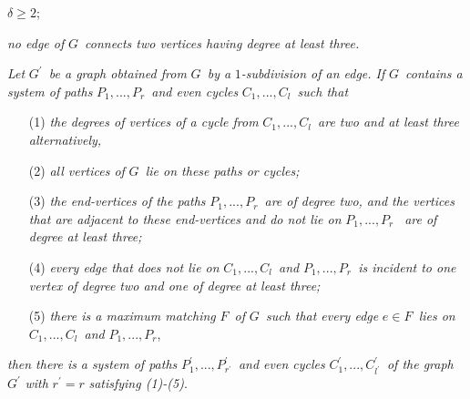 \documentclass[fleqn,12pt,twoside]{article}
\begin{document}
\begin{description}
\item[(a)] $\delta \geq 2$;

\item[(b)] \textit{no edge of }$G$\textit{\ connects two vertices having degree at
least three.}

\item[ ] \textit{Let }$G^{\prime }$\textit{\ be a graph obtained from }$G$\textit{\ by a }$1$\textit{-subdivision of an edge. If }$G$\textit{\
contains a system of paths }$P_{1},...,P_{r}$\textit{\ and even cycles }$C_{1},...,C_{l}$\textit{\ such that }

\begin{enumerate}
\item[(1)] \textit{the degrees of vertices of a cycle from }$C_{1},...,C_{l}$\textit{\ are two and at least three alternatively,}

\item[(2)] \textit{all vertices of }$G$\textit{\ lie on these paths or
cycles;}

\item[(3)] \textit{the end-vertices of the paths }$P_{1},...,P_{r}$\textit{\
are of degree two, and the vertices that are adjacent to these
end-vertices and do not lie on }$P_{1},...,P_{r}$ \textit{\ are of
degree at least three;}

\item[(4)] \textit{every edge that does not lie on }$C_{1},...,C_{l}$\textit{\ and }$P_{1},...,P_{r}$\textit{\ is incident to one vertex of
degree two and one of degree at least three;}

\item[(5)] \textit{there is a maximum matching }$F$\textit{\ of }$G$\textit{\ such that every edge }$e\in F$\textit{\ lies on }$C_{1},...,C_{l}$\textit{\ and }$P_{1},...,P_{r}$,
\end{enumerate}

\item \textit{then there is} \textit{a system of paths }$P_{1}^{\prime
},...,P_{r^{\prime }}^{\prime }$\textit{\ and even cycles
}$C_{1}^{\prime },...,C_{l^{\prime }}^{\prime }$\textit{\ of the
graph }$G^{\prime }$ \textit{with} $r^{\prime }=r$
\textit{satisfying (1)-(5)}.
\end{description}
\end{document}
